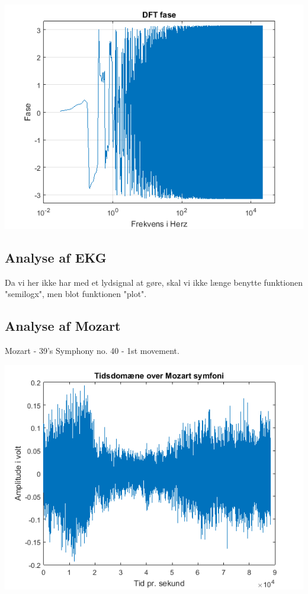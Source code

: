 \documentclass[12pt, letterpaper]{article}
\begin{document}
\begin{center}
\includegraphics[width=\textwidth]{billeder/vindfase}
\end{center}

\subsection{Analyse af EKG}
Da vi her ikke har med et lydsignal at gøre, skal vi ikke længe benytte funktionen "semilogx", men blot funktionen "plot".

\subsection{Analyse af Mozart}
Mozart - 39's Symphony no. 40 - 1st movement. 

\begin{center}
\includegraphics[width=\textwidth]{billeder/mozarttid}
\end{center}
\end{document}
